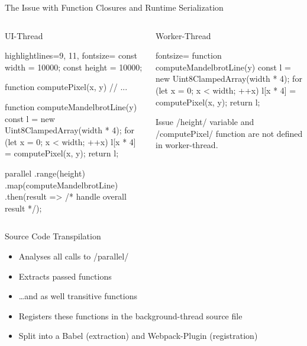 \begin{frame}{The Issue with Function Closures and Runtime Serialization}
	\begin{columns}[t]
	\begin{column}{0.5\textwidth}
		\begin{block}{UI-Thread}
		\begin{javascriptcode*}{highlightlines={9, 11}, fontsize=\tiny}
const width = 10000;
const height = 10000;

function computePixel(x, y) {
	// ...
}

function computeMandelbrotLine(y) {
	const l = new Uint8ClampedArray(width * 4);
	for (let x = 0; x < width; ++x) {
		l[x * 4] = computePixel(x, y);
	}
	return l;
}

parallel
	.range(height) 
	.map(computeMandelbrotLine)	 
	.then(result => /* handle overall result */);
	\end{javascriptcode*}
	\end{block}
	\end{column}
	\pause
	\begin{column}{0.5\textwidth}
		\begin{block}{Worker-Thread}
			\begin{javascriptcode*}{fontsize=\tiny}
function computeMandelbrotLine(y) {
	const l = new Uint8ClampedArray(width * 4);
	for (let x = 0; x < width; ++x) {
		l[x * 4] = computePixel(x, y);
	}
	return l;
}	
			\end{javascriptcode*}

		\end{block}
		
		\begin{alertblock}{Issue}
			\javascriptinline/height/ variable and \javascriptinline/computePixel/ function are not defined in worker-thread.
		\end{alertblock}
	\end{column}
\end{columns}
\end{frame}

\begin{frame}{Source Code Transpilation}
	\begin{itemize}
		\item Analyses all calls to \javascriptinline/parallel/
		\item Extracts passed functions 
		\item \dots and as well transitive functions
		\item Registers these functions in the background-thread source file
		\item Split into a Babel (extraction) and Webpack-Plugin (registration)
	\end{itemize}
\end{frame}

